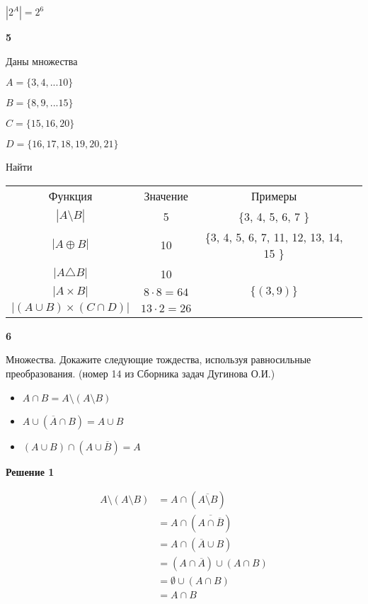 \documentclass{article}
\begin{document}
$|2^A| = 2^6$

\newpage

\textbf{5}

Даны множества

$A = \{ 3, 4, ... 10 \}$

$B = \{ 8, 9, ... 15 \}$

$C = \{ 15, 16, 20 \}$

$D = \{ 16, 17, 18, 19, 20, 21\}$

Найти 

\begin{center}
\begin{tabular}{ c c c c }
  Функция & Значение & Примеры \\
  $|A \setminus B|$ & 5  &  \{3, 4, 5, 6, 7 \}\\
  $| A \oplus B|$ & 10 &  \{3, 4, 5, 6, 7, 11, 12, 13, 14, 15 \}\\
  $| A \triangle B|$ & 10 & \\
  $| A \times B|$ & $8 \cdot 8 = 64$ &  $\{(3, 9)\}$ \\
  $| (A \cup B) \times (C \cap D)|$ & $13 \cdot 2 = 26$ & \\
\end{tabular}
\end{center}


\newpage

\textbf{6} 

Множества. Докажите следующие тождества, используя равносильные преобразования. (номер 14 из Сборника задач Дугинова О.И.)

\begin{itemize}
    \item $A \cap B = A \setminus (A \setminus B)$
    \item $A \cup (\overline{A} \cap B) = A \cup B$
    \item $(A \cup B) \cap (A \cup \overline{B}) = A$
\end{itemize}

\textbf{Решение 1}

\begin{equation} 
\begin{split}
A \setminus (A \setminus B) 
& = A \cap (\overline{A \setminus B}) \\
& = A \cap (\overline{A \cap \overline{B} }) \\
& = A \cap (\overline{A} \cup B ) \\
& = (A \cap \overline{A}) \cup (A \cap B ) \\
& = \emptyset \cup (A \cap B ) \\
& = A \cap B  \\
\end{split}
\end{equation}
\end{document}
